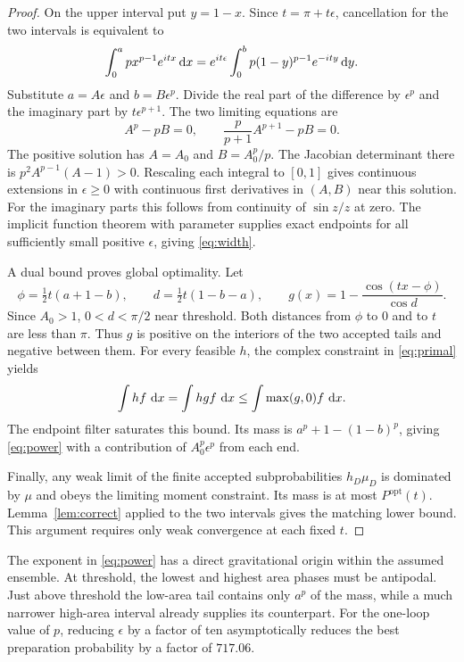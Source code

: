 \documentclass[11pt,letterpaper]{article}
\newcommand{\dd}{\mathop{}\!{\rm d}}
\newcommand{\Prob}{P^{\mathrm{opt}}}
\begin{document}
\begin{proof}
On the upper interval put $y=1-x$. Since $t=\pi+t\epsilon$, cancellation for the two intervals is equivalent to
\begin{equation}\label{eq:balance}
 \int_0^a p x^{p-1}e^{itx}\dd x
 =e^{it\epsilon}\int_0^b p(1-y)^{p-1}e^{-ity}\dd y .
\end{equation}
Substitute $a=A\epsilon$ and $b=B\epsilon^p$. Divide the real part of the difference by $\epsilon^p$ and the imaginary part by $t\epsilon^{p+1}$. The two limiting equations are
\[
 A^p-pB=0,\qquad \frac{p}{p+1}A^{p+1}-pB=0 .
\]
The positive solution has $A=A_0$ and $B=A_0^p/p$. The Jacobian determinant there is $p^2 A^{p-1}(A-1)>0$. Rescaling each integral to $[0,1]$ gives continuous extensions in $\epsilon\geq0$ with continuous first derivatives in $(A,B)$ near this solution. For the imaginary parts this follows from continuity of $\sin z/z$ at zero. The implicit function theorem with parameter supplies exact endpoints for all sufficiently small positive $\epsilon$, giving \eqref{eq:width}.

A dual bound proves global optimality. Let
\[
 \phi=\tfrac12 t(a+1-b),\qquad d=\tfrac12t(1-b-a),\qquad
 g(x)=1-\frac{\cos(tx-\phi)}{\cos d}.
\]
Since $A_0>1$, $0<d<\pi/2$ near threshold. Both distances from $\phi$ to $0$ and to $t$ are less than $\pi$. Thus $g$ is positive on the interiors of the two accepted tails and negative between them. For every feasible $h$, the complex constraint in \eqref{eq:primal} yields
\[
 \int h f\,\dd x=\int h g f\,\dd x\leq\int \max(g,0) f\,\dd x.
\]
The endpoint filter saturates this bound. Its mass is $a^p+1-(1-b)^p$, giving \eqref{eq:power} with a contribution of $A_0^p\epsilon^p$ from each end.

Finally, any weak limit of the finite accepted subprobabilities $h_D\mu_D$ is dominated by $\mu$ and obeys the limiting moment constraint. Its mass is at most $\Prob(t)$. Lemma~\ref{lem:correct} applied to the two intervals gives the matching lower bound. This argument requires only weak convergence at each fixed $t$.
\end{proof}

The exponent in \eqref{eq:power} has a direct gravitational origin within the assumed ensemble. At threshold, the lowest and highest area phases must be antipodal. Just above threshold the low-area tail contains only $a^p$ of the mass, while a much narrower high-area interval already supplies its counterpart. For the one-loop value of $p$, reducing $\epsilon$ by a factor of ten asymptotically reduces the best preparation probability by a factor of $717.06$.
\end{document}
